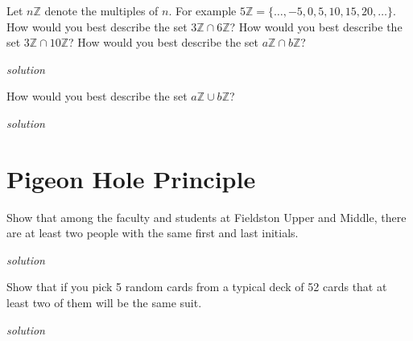 \documentclass{amsbook}
\begin{document}
\begin{Exercise}[title={Multiples of a Number}, difficulty=2, label=os2]
    Let $n\mathbb{Z}$ denote the multiples of $n.$ For example $5\mathbb{Z}=\{\ldots,-5,0,5,10,15,20,\ldots\}$.
    \Question How would you best describe the set $3\mathbb{Z} \cap 6\mathbb{Z}$?
    \Question How would you best describe the set $3\mathbb{Z} \cap 10\mathbb{Z}$?
    \Question How would you best describe the set $a\mathbb{Z} \cap b\mathbb{Z}$?

    \hfill \emph{solution} 
\end{Exercise}

\begin{Answer}[ref={os2}]
    
\end{Answer}

\begin{Exercise}[title={Multiples of a Number II}, difficulty=2, label=os3]
    How would you best describe the set $a\mathbb{Z} \cup b\mathbb{Z}$?

    \hfill \emph{solution} 
\end{Exercise}

\begin{Answer}[ref={os3}]
    
\end{Answer}


\section{Pigeon Hole Principle}

\begin{Exercise}[title={Initial Twins}, difficulty =1, label=php2]
    Show that among the faculty and students at Fieldston Upper and Middle, there are at least two people with the same first and last initials.

    \hfill \emph{solution} 
\end{Exercise}

\begin{Answer}[ref={php2}]
    
\end{Answer}

\begin{Exercise}[title={Not a Flush}, difficulty =1, label=php3]
    Show that if you pick 5 random cards from a typical deck of 52 cards that at least two of them will be the same suit.

    \hfill \emph{solution} 
\end{Exercise}
\end{document}
